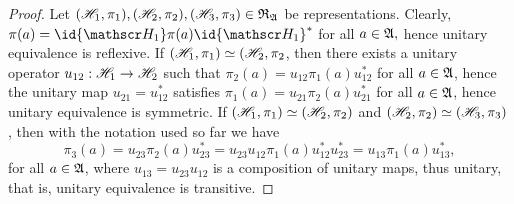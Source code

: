 \begin{proof}
    Let \((\mathscr{H}_1, \pi_1), (\mathscr{H}_2, \pi_2), (\mathscr{H}_3, \pi_3) \in \mathfrak{R}_{\mathfrak{A}}\) be representations. Clearly, \(\pi(a) = \id{\hilbert_1} \pi(a) \id{\hilbert_1}^*\) for all \(a \in \mathfrak{A},\) hence unitary equivalence is reflexive. If \((\mathscr{H}_1, \pi_1) \simeq (\mathscr{H}_2, \pi_2\), then there exists a unitary operator \(u_{12} : \mathscr{H}_1 \to \mathscr{H}_2\) such that \(\pi_2(a) = u_{12}\pi_1(a)u_{12}^*\) for all \(a \in \mathfrak{A}\), hence the unitary map \(u_{21} = u_{12}^*\) satisfies \(\pi_1(a) = u_{21}\pi_2(a) u_{21}^*\) for all \(a \in \mathfrak{A}\), hence unitary equivalence is symmetric. If \((\mathscr{H}_1, \pi_1) \simeq (\mathscr{H}_2, \pi_2)\) and \((\mathscr{H}_2, \pi_2) \simeq (\mathscr{H}_3, \pi_3)\), then with the notation used so far we have 
    \begin{equation*}
        \pi_3(a) = u_{23}\pi_2(a) u_{23}^* = u_{23} u_{12} \pi_1(a) u_{12}^* u_{23}^* = u_{13} \pi_1(a) u_{13}^*,
    \end{equation*}
    for all \(a \in \mathfrak{A}\), where \(u_{13} = u_{23} u_{12}\) is a composition of unitary maps, thus unitary, that is, unitary equivalence is transitive.
\end{proof}
